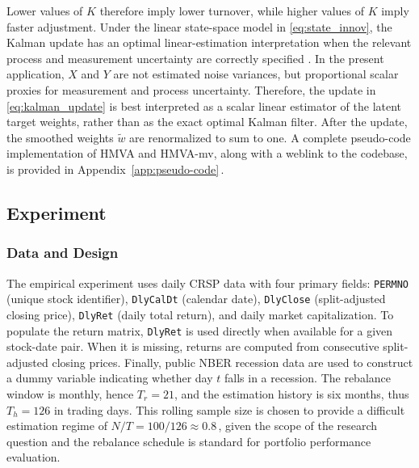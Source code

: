 \documentclass[12pt]{article}
\begin{document}
Lower values of $K$ therefore imply lower turnover, while higher values of $K$ imply faster adjustment. Under the linear state-space model in \eqref{eq:state_innov}, the Kalman update has an optimal linear-estimation interpretation when the relevant process and measurement uncertainty are correctly specified \cite{kalman1960}. In the present application, $X$ and $Y$ are not estimated noise variances, but proportional scalar proxies for measurement and process uncertainty. Therefore, the update in \eqref{eq:kalman_update} is best interpreted as a scalar linear estimator of the latent target weights, rather than as the exact optimal Kalman filter. After the update, the smoothed weights $\tilde{w}$ are renormalized to sum to one. A complete pseudo-code implementation of HMVA and HMVA-mv, along with a weblink to the codebase, is provided in Appendix~\ref{app:pseudo-code}$\,$.

\subsection{Experiment}
\label{sec:data}
\subsubsection{Data and Design}
The empirical experiment uses daily CRSP data with four primary fields: \texttt{PERMNO} (unique stock identifier), \texttt{DlyCalDt} (calendar date), \texttt{DlyClose} (split-adjusted closing price), \texttt{DlyRet} (daily total return), and daily market capitalization. To populate the return matrix, \texttt{DlyRet} is used directly when available for a given stock-date pair. When it is missing, returns are computed from consecutive split-adjusted closing prices. Finally, public NBER recession data are used to construct a dummy variable indicating whether day $t$ falls in a recession. The rebalance window is monthly, hence $T_r=21$, and the estimation history is six months, thus $T_h=126$ in trading days. This rolling sample size is chosen to provide a difficult estimation regime of $N/T = 100/126 \approx 0.8\,$, given the scope of the research question and the rebalance schedule is standard for portfolio performance evaluation.
\end{document}
